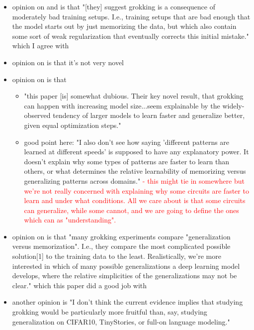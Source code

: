 \documentclass{article}
\begin{document}
\begin{itemize}
\begin{itemize}
\begin{itemize}
            \item opinion on \cite{liu2022omnigrok} and \cite{liu2022towards} is that "[they] suggest grokking is a consequence of moderately bad training setups. I.e., training setups that are bad enough that the model starts out by just memorizing the data, but which also contain some sort of weak regularization that eventually corrects this initial mistake." which I agree with
            \item opinion on \cite{merrill2023tale} is that it's not very novel
            \item opinion on \cite{davies2023unifying} is that 
            \begin{itemize}
                \item "this paper [is] somewhat dubious. Their key novel result, that grokking can happen with increasing model size...seem explainable by the widely-observed tendency of larger models to learn faster and generalize better, given equal optimization steps."
                \item good point here: "I also don't see how saying 'different patterns are learned at different speeds' is supposed to have any explanatory power. It doesn't explain why some types of patterns are faster to learn than others, or what determines the relative learnability of memorizing versus generalizing patterns across domains." \textcolor{red}{- this might tie in somewhere but we're not really concerned with explaining why some circuits are faster to learn and under what conditions. All we care about is that some circuits can generalize, while some cannot, and we are going to define the ones which can as "understanding".}
            \end{itemize}
            \item opinion on \cite{murty2023grokking} is that "many grokking experiments compare "generalization versus memorization". I.e., they compare the most complicated possible solution[1] to the training data to the least. Realistically, we're more interested in which of many possible generalizations a deep learning model develops, where the relative simplicities of the generalizations may not be clear." which this paper did a good job with
            \item another opinion is "I don't think the current evidence implies that studying grokking would be particularly more fruitful than, say, studying generalization on CIFAR10, TinyStories, or full-on language modeling."
            \begin{itemize}

\end{itemize}
\end{itemize}
\end{itemize}
\end{itemize}
\end{document}
